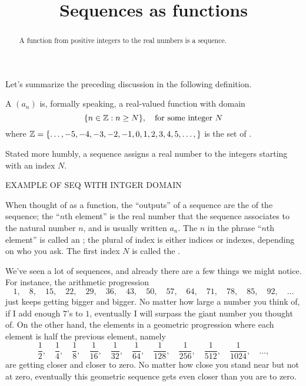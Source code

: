 \documentclass{ximera}
\title[Dig-In:]{Sequences as functions}
\begin{document}
\begin{abstract}
  A function from positive integers to the real numbers is a sequence.
\end{abstract}
\maketitle

Let's summarize the preceding discussion in the following definition.
\begin{definition}
  A  $(a_n)$ is, formally speaking, a real-valued
  function with domain
  \[
  \{ n \in \mathbb Z : n \geq N \},\quad \text{for some integer $N$}
  \]
  where $\mathbb Z = \{\dots, -5,-4,-3,-2,-1,0,1,2,3,4,5,\dots,\}$ is the set
  of .
\end{definition}

Stated more humbly, a sequence assigns a real number to the integers
starting with an index $N$.

\begin{example}
  EXAMPLE OF SEQ WITH INTGER DOMAIN
\end{example}

When thought of as a function, the ``outputs'' of a sequence are the
 of the sequence; the ``$n$th element'' is the real
number that the sequence associates to the natural number $n$, and is
usually written $a_n$.  The $n$ in the phrase
``$n$th element'' is called an ; the
plural of index is either indices or indexes, depending on who you
ask.  The first index $N$ is called the .


We've seen a lot of sequences, and already there are a few things we
might notice.  For instance, the arithmetic progression
\[
1,\quad 8,\quad 15,\quad 22,\quad 29,\quad 36,\quad 43,\quad 50,\quad 57,\quad 64,\quad 71,\quad 78,\quad 85,\quad 92,\quad \ldots
\]
just keeps getting bigger and bigger.  No matter how large a number
you think of, if I add enough $7$'s to $1$, eventually I will surpass
the giant number you thought of.  On the other hand, the elements in a
geometric progression where each element is half the previous element,
namely
\[
\frac{1}{2},\quad \frac{1}{4},\quad \frac{1}{8},\quad \frac{1}{16},\quad \frac{1}{32},\quad \frac{1}{64},\quad \frac{1}{128},\quad \frac{1}{256},\quad \frac{1}{512},\quad \frac{1}{1024},\quad \ldots ,
\]
are getting closer and closer to zero.  No matter how close you stand
near but not at zero, eventually this geometric sequence gets even
closer than you are to zero.
\end{document}
